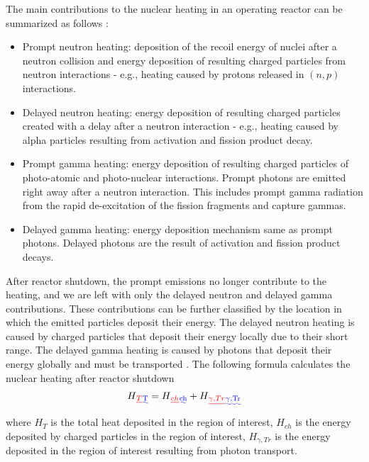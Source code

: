 \documentclass{style/nseJournal}
\providecommand{\DIFadd}[1]{{\protect\color{blue}\uwave{#1}}} %
\providecommand{\DIFdel}[1]{{\protect\color{red}\sout{#1}}}                      %
\providecommand{\DIFaddbegin}{} %
\providecommand{\DIFaddend}{} %
\providecommand{\DIFdelbegin}{} %
\providecommand{\DIFdelend}{} %
\begin{document}
The main contributions to the nuclear heating in an operating reactor can be summarized as follows \cite{lemaire_estimation_2015}:
\begin{itemize}
  \item Prompt neutron heating: deposition of the recoil energy of nuclei after a neutron collision and energy deposition of resulting charged particles from neutron interactions - e.g., heating caused by protons released in $(n,p)$ interactions.
  \item Delayed neutron heating: energy deposition of resulting charged particles created with a delay after a neutron interaction - e.g., heating caused by alpha particles resulting from activation and fission product decay.
  \item Prompt gamma heating: energy deposition of resulting charged particles of photo-atomic and photo-nuclear interactions. Prompt photons are emitted right away after a neutron interaction. This includes prompt gamma radiation from the rapid de-excitation of the fission fragments and capture gammas.
  \item Delayed gamma heating: energy deposition mechanism same as prompt photons. Delayed photons are the result of activation and fission product decays.
\end{itemize}

After reactor shutdown, the prompt emissions no longer contribute to the heating, and we are left with only the delayed neutron and delayed gamma contributions.
These contributions can be further classified by the location in which the emitted particles deposit their energy.
The delayed neutron heating is caused by charged particles that deposit their energy locally due to their short range.
The delayed gamma heating is caused by photons that deposit their energy globally and must be transported \cite{peterson-droogh_current_2018}.
The following formula calculates the nuclear heating after reactor shutdown
\begin{align}
H\DIFdelbegin \DIFdel{_{T} }\DIFdelend \DIFaddbegin \DIFadd{_{\mathrm{T}} }\DIFaddend = H\DIFdelbegin \DIFdel{_{ch} }\DIFdelend \DIFaddbegin \DIFadd{_{\mathrm{ch}} }\DIFaddend + H\DIFdelbegin \DIFdel{_{\gamma, Tr} }\DIFdelend \DIFaddbegin \DIFadd{_{\mathrm{\gamma, Tr}} }\DIFaddend \label{eq:heat}
\end{align}
where \DIFdelbegin \DIFdel{$H_{T}$ }\DIFdelend \DIFaddbegin \DIFadd{$H_{\mathrm{T}}$ }\DIFaddend is the total heat deposited in the region of interest, \DIFdelbegin \DIFdel{$H_{ch}$ }\DIFdelend \DIFaddbegin \DIFadd{$H_{\mathrm{ch}}$ }\DIFaddend is the energy deposited by charged particles in the region of interest, \DIFdelbegin \DIFdel{$H_{\gamma, Tr}$ }\DIFdelend \DIFaddbegin \DIFadd{$H_{\mathrm{\gamma, Tr}}$ }\DIFaddend is the energy deposited in the region of interest resulting from photon transport.
\end{document}
